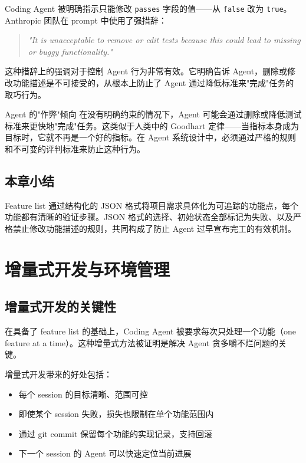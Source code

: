 \documentclass[a4paper]{article}
\begin{document}
Coding Agent 被明确指示只能修改 \texttt{passes} 字段的值——从 \texttt{false} 改为 \texttt{true}。Anthropic 团队在 prompt 中使用了强措辞：

\begin{quote}
\textit{"It is unacceptable to remove or edit tests because this could lead to missing or buggy functionality."}
\end{quote}

这种措辞上的强调对于控制 Agent 行为非常有效。它明确告诉 Agent，删除或修改功能描述是不可接受的，从根本上防止了 Agent 通过降低标准来"完成"任务的取巧行为。

\begin{warningbox}{Agent 的"作弊"倾向}
在没有明确约束的情况下，Agent 可能会通过删除或降低测试标准来更快地"完成"任务。这类似于人类中的 Goodhart 定律——当指标本身成为目标时，它就不再是一个好的指标。在 Agent 系统设计中，必须通过严格的规则和不可变的评判标准来防止这种行为。
\end{warningbox}

\subsection{本章小结}

Feature list 通过结构化的 JSON 格式将项目需求具体化为可追踪的功能点，每个功能都有清晰的验证步骤。JSON 格式的选择、初始状态全部标记为失败、以及严格禁止修改功能描述的规则，共同构成了防止 Agent 过早宣布完工的有效机制。


\section{增量式开发与环境管理}

\subsection{增量式开发的关键性}

在具备了 feature list 的基础上，Coding Agent 被要求每次只处理一个功能（one feature at a time）。这种增量式方法被证明是解决 Agent 贪多嚼不烂问题的关键。

增量式开发带来的好处包括：
\begin{itemize}
    \item 每个 session 的目标清晰、范围可控
    \item 即使某个 session 失败，损失也限制在单个功能范围内
    \item 通过 git commit 保留每个功能的实现记录，支持回滚
    \item 下一个 session 的 Agent 可以快速定位当前进展
\end{itemize}
\end{document}
